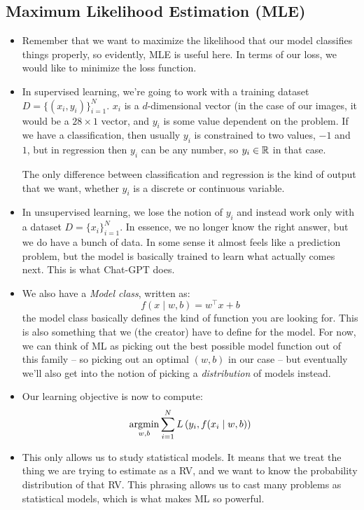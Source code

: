 \subsection{Maximum Likelihood Estimation (MLE)}
\begin{itemize}
	\item Remember that we want to maximize the likelihood that our model classifies
		things properly, so evidently, MLE is useful here. In terms of our loss, we
		would like to minimize the loss function. 
	\item In supervised learning, we're going to work with a 
		training dataset \( D = \{(x_i, y_i)\}_{i
		= 1}^{N} \). \( x_i \) is a \( d \)-dimensional vector (in the case of our
		images, it would be a \( 28 \times 1 \) vector, and \( y_i \) is some value
		dependent on the problem. If we have a classification, then usually \( y_i \)
		is constrained to two values, \( -1 \) and \( 1 \), but in regression then \(
		y_i\) can be any number, so \( y_i \in \mathbb R \) in that case.  

		The only difference between classification and regression is the kind of
		output that we want, whether \( y_i \) is a discrete or continuous variable. 
	\item In unsupervised learning, we lose the notion of \( y_i  \) and instead 
		work only with a dataset \( D = \{x_i\}_{i = 1}^{N} \). In essence, we no
		longer know the right answer, but we do have a bunch of data. In some sense
		it almost feels like a prediction problem, but the model is basically trained
		to learn what actually comes next. This is what Chat-GPT does. 
	\item We also have a \textit{Model class}, written as:
		\[
			f(x \mid w, b) = w^{\top} x + b
		\]
		the model class basically defines the kind of function you are looking for.
		This is also something that we (the creator) have to define for the model. 
		For now, we can think of ML as picking out the best possible model function
		out of this family -- so picking out an optimal \( (w, b) \) in our case --
		but eventually we'll also get into the notion of picking
		a \textit{distribution} of models instead. 

	\item Our learning objective is now to compute:
		\[
			\operatorname*{argmin}_{w, b} \sum_{i = 1}^{N}L\left(y_i, f(x_i \mid w, b)\right)
		\]
	\item This only allows us to study statistical models. It means that we treat the
		thing we are trying to estimate as a RV, and we want to know the probability
		distribution of that RV. This phrasing allows us to cast many problems as
		statistical models, which is what makes ML so powerful.   
\end{itemize}


